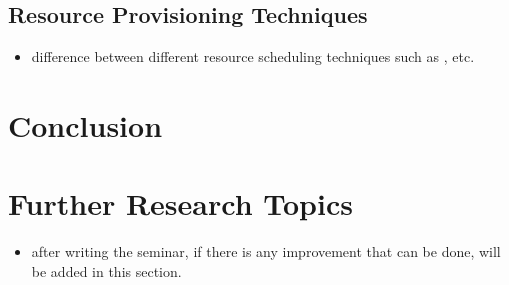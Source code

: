 \subsection{Resource Provisioning Techniques}
\begin{itemize}
  \item difference between different resource scheduling techniques such  as \cite{Bittencourt2017}, \cite{Haja2019} etc.
\end{itemize}

\section{Conclusion}
\label{sec:concl}

\section{Further Research Topics}
\label{sec:research}
\begin{itemize}
  \item after writing the seminar, if there is any improvement that can be done, will be added in this section.
\end{itemize}
